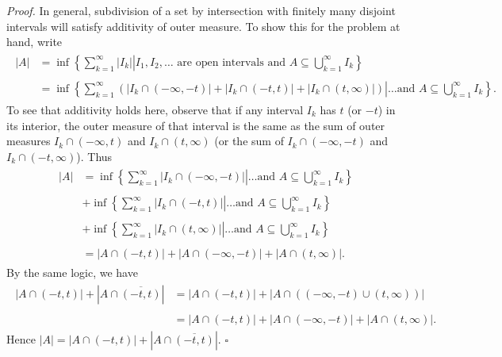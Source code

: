 \documentclass[a4paper]{article}
\begin{document}
\emph{Proof.} In general, subdivision of a set by intersection with finitely many disjoint intervals will satisfy additivity of outer measure. To show this for the problem at hand, write
\begin{align}
\begin{split}
    |A| &= \inf\left\{\left.\sum_{k=1}^\infty |I_k| \right| I_1, I_2, \ldots \text{ are open intervals and } A \subseteq \bigcup_{k=1}^\infty I_k\right\} \\ \ \\
    &= \inf\left\{\left.\sum_{k=1}^\infty (|I_k \cap (-\infty, -t)| + |I_k \cap (-t, t)| + |I_k \cap (t, \infty)|) \right| \ldots \text{and } A \subseteq \bigcup_{k=1}^\infty I_k\right\}.
\end{split}
\end{align}
To see that additivity holds here, observe that if any interval $I_k$ has $t$ (or $-t$) in its interior, the outer measure of that interval is the same as the sum of outer measures $I_k \cap (-\infty, t)$ and $I_k \cap (t, \infty)$ (or the sum of $I_k \cap (-\infty, -t)$ and $I_k \cap (-t, \infty)$). Thus
\begin{align}
\begin{split}
    |A| &= \inf\left\{\left.\sum_{k=1}^\infty |I_k \cap (-\infty, -t)| \right| \ldots \text{and } A \subseteq \bigcup_{k=1}^\infty I_k\right\} \\ \ \\
    &+ \inf\left\{\left.\sum_{k=1}^\infty |I_k \cap (-t, t)| \right| \ldots \text{and } A \subseteq \bigcup_{k=1}^\infty I_k\right\} \\ \ \\
    &+ \inf\left\{\left.\sum_{k=1}^\infty |I_k \cap (t, \infty)| \right| \ldots \text{and } A \subseteq \bigcup_{k=1}^\infty I_k\right\} \\ \ \\
    &= |A \cap (-t, t)| + |A \cap (-\infty, -t)| + |A \cap (t, \infty)|.
\end{split}
\end{align}
By the same logic, we have
\begin{align}
\begin{split}
    |A \cap (-t, t)| + |A \cap \overline{(-t, t)}| &= |A \cap (-t, t)| + |A \cap ((-\infty, -t) \cup (t, \infty))| \\ \ \\
    &= |A \cap (-t, t)| + |A \cap (-\infty, -t)| + |A \cap (t, \infty)|.
\end{split}
\end{align}
Hence $|A| = |A \cap (-t, t)| + |A \cap \overline{(-t, t)}|$. $\square$
\end{document}
